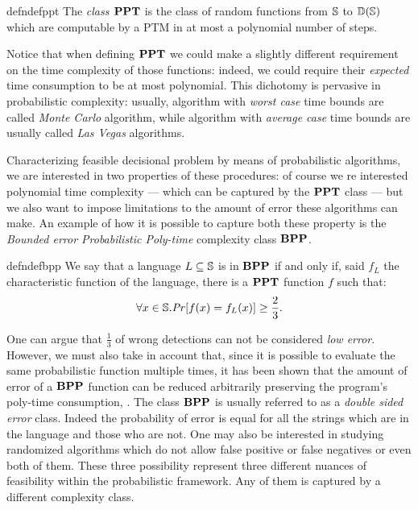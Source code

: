\begin{restatable}{defn}{defppt}
  \label{def:pptinformal}
The \emph{class $\mathbf{PPT}$} is the class of random functions
from $\mathbb{S}$ to $\mathbb D(\mathbb{S})$
which are computable by a PTM in at most a polynomial
number of steps.
\end{restatable}

Notice that when defining $\mathbf{PPT}$ we could make a slightly different requirement on the time complexity of those functions: indeed, we could require their \emph{expected} time consumption to be at most polynomial. This dichotomy is pervasive in probabilistic complexity: usually, algorithm with \emph{worst case} time bounds are called \emph{Monte Carlo} algorithm, while algorithm with \emph{average case} time bounds are usually called \emph{Las Vegas} algorithms.

Characterizing feasible decisional problem by means of
probabilistic algorithms, we are interested
in two properties of these procedures: of course we re interested
polynomial time complexity ---
which can be captured by the $\mathbf{PPT}$ class --- but we also want to impose
limitations to the amount of error these algorithms can make.
%
An example of how it is possible to capture both these property is the
\emph{Bounded error Probabilistic Poly-time} complexity class $\mathbf{BPP}$.

\begin{restatable}{defn}{defbpp}
  \label{def:bppinformal}
We say that a language $L\subseteq \mathbb{S}$ is in $\mathbf{BPP}$ if and only if,
said $f_L$ the characteristic function of the language,
there is a $\mathbf{PPT}$ function $f$ such that:
$$
\forall x \in \mathbb{S}.\mathit{Pr}[f(x)=f_L(x)]\ge \frac 2 3.
$$
\end{restatable}

One can argue that $\frac 1 3$ of wrong detections
can not be considered \emph{low error}. However, we must also take in account
that, since it is possible to evaluate the same probabilistic function multiple
times, it has been shown that the amount of error of a $\mathbf{BPP}$ function can
be reduced arbitrarily preserving the program's poly-time consumption,
\cite[Lemma 7.9]{AroraBarak}.
%
The class $\mathbf{BPP}$ is usually referred to as a \emph{double sided error} class.
Indeed the probability of error is equal for all the strings which are in the language
and those who are not.
%
One may also be interested in studying randomized algorithms which do not allow
false positive or false negatives or even both of them. These three possibility
represent three different nuances of feasibility within the probabilistic
framework. Any of them is captured by a different complexity class.

